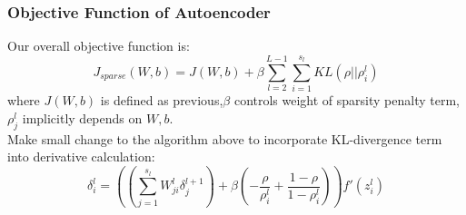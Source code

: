 \documentclass{beamer}
\begin{document}
\begin{CJK*}{UTF8}{gbsn}
\begin{frame}\frametitle{Objective Function of Autoencoder}
Our overall objective function is:
\begin{equation}
J_{sparse}(W,b)=J(W,b)+\beta\sum_{l=2}^{L-1}\sum_{i=1}^{s_l}KL(\rho||\rho_i^l)
\end{equation}
where $J(W,b)$ is defined as previous,$\beta$ controls weight of sparsity penalty term,$\rho_j^l$ implicitly depends on $W,b$.\\
\bigskip
Make small change to the algorithm above to incorporate KL-divergence term into derivative calculation:
\begin{equation}\label{eq:deltasparse}
\delta_i^l=\left(\left(\sum_{j=1}^{s_l}W_{ji}^l\delta_j^{l+1}\right)+\beta\left(-\frac{\rho}{\rho_i^l}+\frac{1-\rho}{1-\rho_i^l}\right)\right)f'(z_i^l)
\end{equation}
\end{frame}



\end{CJK*}
\end{document}
